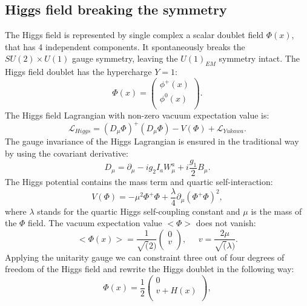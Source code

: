 \subsection{Higgs field breaking the symmetry}
\label{sec:symmetry_breaking}
The Higgs field is represented by single complex a scalar doublet field $\Phi(x)$, that has 4 independent components. It spontaneously breaks the  $SU(2)\times U(1)$ gauge symmetry, leaving the $U(1)_{EM}$ symmetry intact. The Higgs field doublet has the hypercharge $Y=1$:
  \begin{equation}
\Phi(x) = \begin{pmatrix}
\phi^{+}(x)  \\
\phi^{0}(x)  \\
\end{pmatrix}.
\end{equation}
The Higgs field Lagrangian with non-zero vacuum expectation value is: 
 \begin{equation}
\mathcal{L}_{Higgs} = (D_{\mu}\Phi)^+(D_{\mu}\Phi)-V(\Phi)+\mathcal{L}_{Yukawa}.
\end{equation}
The gauge invariance of the Higgs Lagrangian is ensured in the traditional way by using the covariant derivative:
 \begin{equation}
D_{\mu} = \partial_{\mu} - ig_2I_aW^a_{\mu}+i\frac{g_1}{2}B_{\mu}.
\end{equation}
The Higgs potential contains the mass term and quartic self-interaction:
 \begin{equation}
V(\Phi) = -\mu^2 \Phi^+\Phi + \frac{\lambda}{4}\partial_{\mu}(\Phi^+\Phi)^2,
\end{equation}
where $\lambda$ stands for the quartic Higgs self-coupling constant and $\mu$ is the mass of the $\Phi$ field. The vacuum expectation value $<\Phi>$ does not vanish:
  \begin{equation}
<\Phi(x)> = \frac{1}{\sqrt(2)}\begin{pmatrix}
0  \\
v \\
\end{pmatrix},\;\;\;\;\; 
v = \frac{2\mu}{\sqrt(\lambda)}.
\end{equation}
Applying the unitarity gauge \cite{weinberg2} we can constraint three out of four degrees of freedom of the Higgs field and rewrite the Higgs doublet in the following way:
  \begin{equation}
 \Phi(x) = \frac{1}{2}\begin{pmatrix}
 	0 \\
 	v+H(x)  \\
 \end{pmatrix},
  \end{equation}
